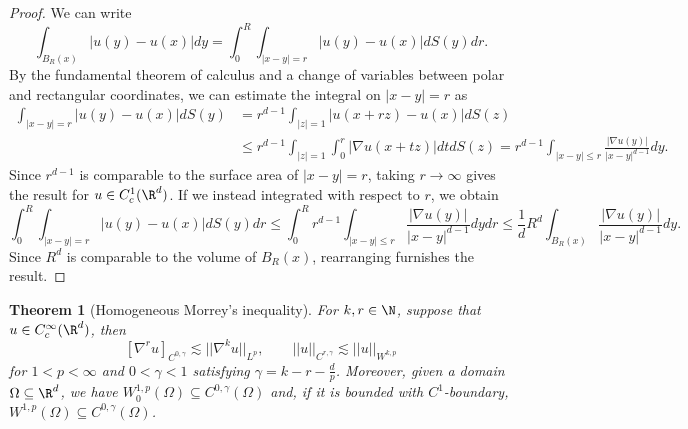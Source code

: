 \documentclass[reqno]{amsart}
\newtheorem{theorem}{Theorem}
\theoremstyle{definition}
\theoremstyle{remark}
\begin{document}
\begin{proof}
	We can write
		\[  \int_{B_R (x)} |u(y) - u(x)| dy  = \int_0^R \int_{|x - y| = r} |u(y) - u(x)| dS(y) d r. \]
	By the fundamental theorem of calculus and a change of variables between polar and rectangular coordinates, we can estimate the integral on $|x - y| = r$ as
		\begin{align*}
			 \int_{|x - y| = r} |u(y) - u(x)| dS(y) 
			 	&= r^{d - 1} \int_{|z| = 1} |u(x + rz) - u(x)| dS(z) \\
			 	&\leq r^{d - 1} \int_{|z| = 1} \int_0^r |\nabla u (x + tz) | dt dS(z) = r^{d - 1} \int_{|x - y| \leq r} \frac{|\nabla u(y)|}{|x - y|^{d - 1}} dy. 		 	
		\end{align*}	
	Since $r^{d - 1}$ is comparable to the surface area of $|x - y| = r$, taking $r \to \infty$ gives the result for $u \in C^1_c (\R^d)$. If we instead integrated with respect to $r$, we obtain
		\[ \int_0^R \int_{|x - y| = r} |u(y) - u(x)| dS(y) d r \leq \int_0^R r^{d - 1} \int_{|x - y| \leq r} \frac{|\nabla u(y)|}{|x - y|^{d - 1}} dy dr\leq \frac1d R^d \int_{B_R (x)} \frac{|\nabla u(y)|}{|x - y|^{d - 1}} dy. \]	
	Since $R^d$ is comparable to the volume of $B_R (x)$, rearranging furnishes the result. 	
\end{proof}

\begin{theorem}[Homogeneous Morrey's inequality]
	For $k,r \in\N$, suppose that $u \in C^\infty_c (\R^d)$, then 
		\[ [\nabla^r u]_{C^{0, \gamma}} \lesssim || \nabla^k u||_{L^p}, \qquad  ||u||_{C^{r, \gamma}} \lesssim ||u||_{W^{k, p}} \]
	for $1 < p < \infty$ and $0 < \gamma < 1$ satisfying $\gamma = k - r - \tfrac{d}{p}$. Moreover, given a domain $\Omega \subseteq \R^d$, we have $W^{1, p}_0 (\Omega) \subseteq C^{0, \gamma} (\Omega)$ and, if it is bounded with $C^1$-boundary, $W^{1, p} (\Omega) \subseteq C^{0, \gamma} (\Omega)$.
\end{theorem}
\end{document}
